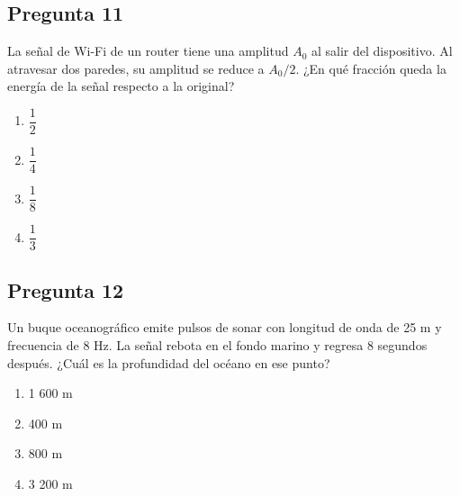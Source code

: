 \begin{preguntabox}
\section{Pregunta 11}
La señal de Wi-Fi de un router tiene una amplitud $A_0$ al salir del dispositivo. Al atravesar dos paredes, su amplitud se reduce a $A_0/2$. ¿En qué fracción queda la energía de la señal respecto a la original?

\begin{enumerate}
    \item[A)] $\dfrac{1}{2}$
    \item[B)] $\dfrac{1}{4}$
    \item[C)] $\dfrac{1}{8}$
    \item[D)] $\dfrac{1}{3}$
\end{enumerate}
\end{preguntabox}

\begin{preguntabox}
\section{Pregunta 12}
Un buque oceanográfico emite pulsos de sonar con longitud de onda de 25 m y frecuencia de 8 Hz. La señal rebota en el fondo marino y regresa 8 segundos después. ¿Cuál es la profundidad del océano en ese punto?

\begin{enumerate}
    \item[A)] 1 600 m
    \item[B)] 400 m
    \item[C)] 800 m
    \item[D)] 3 200 m
\end{enumerate}
\end{preguntabox}

